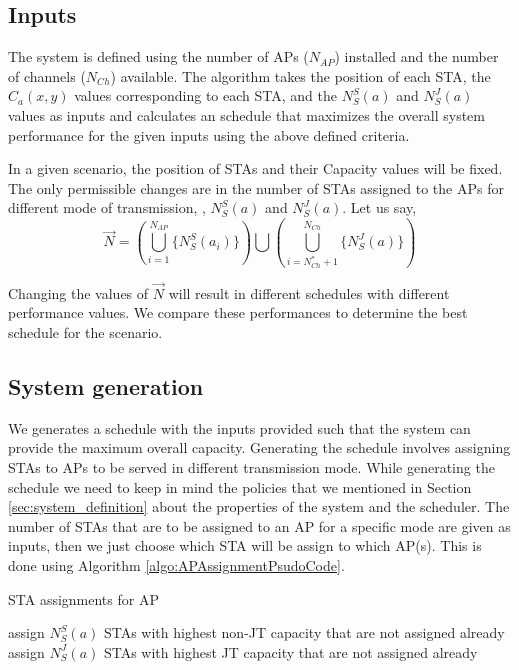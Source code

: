 \subsection{Inputs}
The system is defined using the number of APs ($N_{AP}$) installed and the number of channels ($N_{Ch}$) available.
The algorithm takes the position of each STA, the $C_a(x, y)$ values corresponding to each STA, and the $N_S^S(a)$ and $N_S^J(a)$ values as inputs and calculates an schedule that maximizes the overall system performance for the given inputs using the above defined criteria.

In a given scenario, the position of STAs and their Capacity values will be fixed. The only permissible changes are in the number of STAs assigned to the APs for different mode of transmission, \ie, $N_S^S(a)$ and $N_S^J(a)$.
Let us say,
\begin{equation}
    \Vec{N} = \left( \bigcup\limits_{i = 1}^{N_{AP}} \big\{ N_S^S(a_i) \big\} \right) \bigcup \left( \bigcup\limits_{i = N_{Ch}^* + 1}^{N_{Ch}} \big\{ N_S^J(a) \big\} \right)
\end{equation}

Changing the values of $\vec{N}$ will result in different schedules with different performance values. We compare these performances to determine the best schedule for the scenario.




\subsection{System generation}
We generates a schedule with the inputs provided such that the system can provide the maximum overall capacity.
Generating the schedule involves assigning STAs to APs to be served in different transmission mode. While generating the schedule we need to keep in mind the policies that we mentioned in Section \ref{sec:system_definition} about the properties of the system and the scheduler. The number of STAs that are to be assigned to an AP for a specific mode are given as inputs, then we just choose which STA will be assign to which AP(s). This is done using Algorithm \ref{algo:APAssignmentPsudoCode}.

\begin{algorithm}[h]
    \caption{STA assignments for AP}
    \label{algo:APAssignmentPsudoCode}
    \begin{algorithmic}[1]
                \State assign $N_S^S(a)$ STAs with highest non-JT capacity that are not assigned already
            \EndFor
        \EndFor
                \State assign $N_S^J(a)$ STAs with highest JT capacity that are not assigned already
            \EndFor
        \EndFor
    \end{algorithmic}
\end{algorithm}

